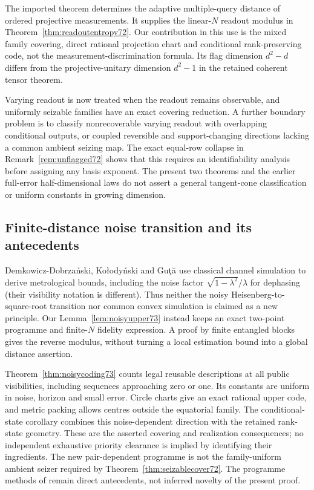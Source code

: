 The imported theorem \cite[Corollary~1 and Theorem~2]{PPKKO72}
determines the adaptive multiple-query distance of ordered projective
measurements. It supplies the linear-$N$ readout modulus in
Theorem~\ref{thm:readoutentropy72}. Our contribution in this use is the
mixed family covering, direct rational projection chart and conditional
rank-preserving code, not the measurement-discrimination formula.
Its flag dimension $d^2-d$ differs from the projective-unitary dimension
$d^2-1$ in the retained coherent tensor theorem.

Varying readout is now treated when the readout remains observable,
and uniformly seizable families have an exact covering reduction.
A further boundary problem is to classify nonrecoverable varying
readout with overlapping conditional outputs, or coupled reversible
and support-changing directions lacking a common ambient seizing map.
The exact equal-row collapse in Remark~\ref{rem:unflagged72} shows
that this requires an identifiability analysis before assigning any
basis exponent. The present two theorems and the earlier full-error
half-dimensional laws do not assert a general tangent-cone classification
or uniform constants in growing dimension.


\subsection{Finite-distance noise transition and its antecedents}
Demkowicz-Dobrza\'nski, Ko\l ody\'nski and Gu\c t\u a
\cite[Eq.~(4) and the dephasing example]{DKG67} use classical channel
simulation to derive metrological bounds, including the noise factor
$\sqrt{1-\lambda^2}/\lambda$ for dephasing (their visibility notation
is different). Thus neither the noisy Heisenberg-to-square-root
transition nor common convex simulation is claimed as a new principle.
Our Lemma~\ref{lem:noisyupper73} instead keeps an exact two-point
programme and finite-$N$ fidelity expression. A proof by finite
entangled blocks gives the reverse modulus, without turning a local
estimation bound into a global distance assertion.

Theorem~\ref{thm:noisycoding73} counts legal reusable descriptions at
all public visibilities, including sequences approaching zero or one.
Its constants are uniform in noise, horizon and small error. Circle
charts give an exact rational upper code, and metric packing allows
centres outside the equatorial family. The conditional-state corollary
combines this noise-dependent direction with the retained rank-state
geometry. These are the asserted covering and realization consequences;
no independent exhaustive priority clearance is implied by identifying
their ingredients. The new pair-dependent programme is not the
family-uniform ambient seizer required by
Theorem~\ref{thm:seizablecover72}. The programme methods of
\cite{DW72,WBHK72,WW72} remain direct antecedents, not inferred
novelty of the present proof.

